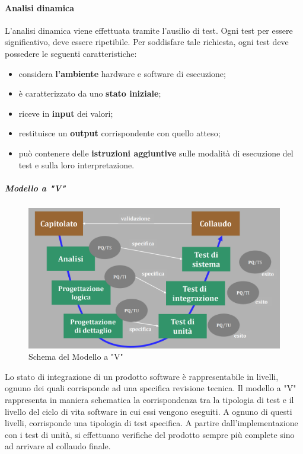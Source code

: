 \paragraph{Analisi dinamica}
L'analisi dinamica viene effettuata tramite l'ausilio di test. Ogni test per essere significativo, deve essere ripetibile. Per soddisfare tale richiesta, ogni test deve possedere le seguenti caratteristiche:
\begin{itemize}
	\item considera \textbf{l'ambiente} hardware e software di esecuzione;
	\item è caratterizzato da uno \textbf{stato iniziale};
	\item riceve in \textbf{input} dei valori;
	\item restituisce un \textbf{output} corrispondente con quello atteso;
	\item può contenere delle \textbf{istruzioni aggiuntive} sulle modalità di esecuzione del test e sulla loro interpretazione.
\end{itemize}

\subparagraph*{Modello a "V"}
\begin{figure}[h!]
	\caption{Schema del Modello a "V"}
	\centering
	\includegraphics[width=\textwidth]{res/img/modelloV.png}
\end{figure}
Lo stato di integrazione di un prodotto software è rappresentabile in livelli, ognuno dei quali corrisponde ad una specifica revisione tecnica. Il modello a "V" rappresenta in maniera schematica la corrispondenza tra la tipologia di test e il livello del ciclo di vita software in cui essi vengono eseguiti. A ognuno di questi livelli, corrisponde una tipologia di test specifica. A partire dall'implementazione con i test di unità, si effettuano verifiche del prodotto sempre più complete sino ad arrivare al collaudo finale.

